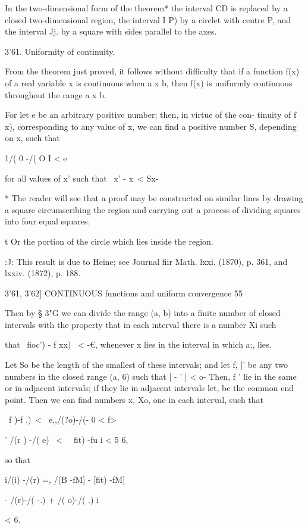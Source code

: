 In the two-dimensional form of the theorem* the interval CD is
replaced by a closed two-dimensional region, the interval I P) by a
circlet with centre P, and the interval Jj. by a square with sides
parallel to the axes.

3'61. Uniformity of continuity.

From the theorem just proved, it follows without difficulty that if a
function f(x) of a real variable x is continuous when a x b, then f(x)
is unifurmly continuous throughout the range a x b.

For let e be an arbitrary positive number; then, in virtue of the
con- tinuity of f x), corresponding to any value of x, we can find a
positive number S, depending on x, such that

1/( 0 -/( O I < e

for all values of x' such that \ x' - x\ < Sx-

* The reader will see that a proof may be constructed on similar lines
by drawing a square circumscribing the region and carrying out a
process of dividing squares into four equal squares.

t Or the portion of the circle which lies inside the region.

:J: This result is due to Heine; see Journal fiir Math. lxxi. (1870),
p. 361, and lxxiv. (1872), p. 188.



3'61, 3'62] CONTINUOUS functions and uniform convergence 55

Then by § 3"G we can divide the range (a, b) into a finite number of
closed intervals with the property that in each interval there is a
number Xi such

that \ fioc') - f xx) \ < -€, whenever x lies in the interval in which
a;, lies.

Let So be the length of the smallest of these intervals; and let f,
|' be any two numbers in the closed range (a, 6) such that | - ' | <
o- Then, f ' lie in the same or in adjacent intervals; if they lie
in adjacent intervals let, be the common end point. Then we can find
numbers x, Xo, one in each interval, such that

\ f )-f .)\ < \ e,,/(?o)-/(- 0 < f>

' /(r ) -/( e) \ < \ \, fit) -fu i < 5 6,

so that

i/(i) -/(r) =, /(B -fM] - [fit) -fM]

- /(r)-/( -.) + /( o)-/( .) i

< 6.

